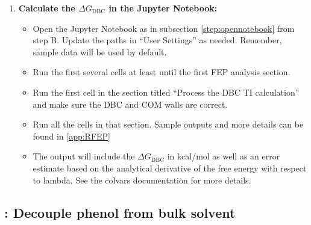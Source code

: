 \documentclass[9pt,tutorial]{Styling/livecoms}
\begin{document}
\begin{enumerate}[label=\arabic*.]
\begin{enumerate}[label=\alph*., ref=\theenumi.\alph*]
\begin{itemize}
            \end{itemize}
            \item \textbf{Calculate the $\Delta G_\mathrm{DBC}$ in the Jupyter Notebook:}
            \begin{itemize}
                \item Open the Jupyter Notebook as in subsection \ref{step:opennotebook} from step B. Update the paths in ``User Settings'' as needed. Remember, sample data will be used by default.
                \item Run the first several cells at least until the first FEP analysis section. 
                \item Run the first cell in the section titled ``Process the DBC TI calculation'' and make sure the DBC and COM walls are correct.
                \item Run all the cells in that section. Sample outputs and more details can be found in \ref{app:RFEP}
                \item The output will include the $\Delta G_\mathrm{DBC}$ in kcal/mol as well as an error estimate based on the analytical derivative of the free energy with respect to lambda. See the colvars documentation for more details.
            \end{itemize}
        \end{enumerate}
    \end{enumerate}
    
\subsection{\hspace{-1em}: Decouple phenol from bulk solvent}
\end{document}
